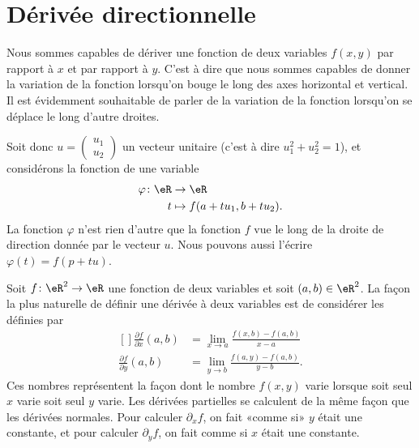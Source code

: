 \section{Dérivée directionnelle}

Nous sommes capables de dériver une fonction de deux variables $f(x,y)$ par rapport à $x$ et par rapport à $y$. C'est à dire que nous sommes capables de donner la variation de la fonction lorsqu'on bouge le long des axes horizontal et vertical. Il est évidemment souhaitable de parler de la variation de la fonction lorsqu'on se déplace le long d'autre droites.

Soit donc $u=\begin{pmatrix}
    u_1    \\ 
    u_2    
\end{pmatrix}$ un vecteur unitaire (c'est à dire $u_1^2+u_2^2=1$), et considérons la fonction de une variable
\begin{equation}
    \begin{aligned}
        \varphi\colon \eR&\to \eR \\
        t&\mapsto f(a+tu_1,b+tu_2). 
    \end{aligned}
\end{equation}
La fonction $\varphi$ n'est rien d'autre que la fonction $f$ vue le long de la droite de direction donnée par le vecteur $u$. Nous pouvons aussi l'écrire $\varphi(t)=f(p+tu)$.

Soit $f\colon \eR^2\to \eR$ une fonction de deux variables et soit $(a,b)\in\eR^2$. La façon la plus naturelle de définir une dérivée à deux variables est de considérer les  définies par
\begin{equation}
    \begin{aligned}[]
        \frac{ \partial f }{ \partial x }(a,b)&=\lim_{x\to a} \frac{ f(x,b)-f(a,b) }{ x-a }\\
        \frac{ \partial f }{ \partial y }(a,b)&=\lim_{y\to b} \frac{ f(a,y)-f(a,b) }{y-b}.
    \end{aligned}
\end{equation}
Ces nombres représentent la façon dont le nombre $f(x,y)$ varie lorsque soit seul $x$ varie soit seul $y$ varie. Les dérivées partielles se calculent de la même façon que les dérivées normales. Pour calculer $\partial_xf$, on fait «comme si» $y$ était une constante, et pour calculer $\partial_yf$, on fait comme si $x$ était une constante.

